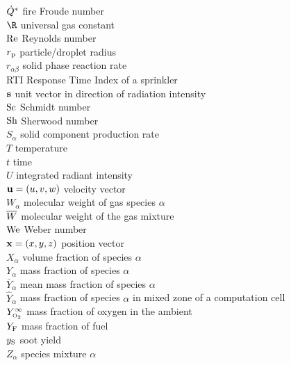 \begin{tabbing}
$\dot{Q}^*$                   \> fire Froude number \\
$\R$                      \> universal gas constant \\
$\hbox{Re}$                     \> Reynolds number \\
$r_{\rm p}$               \> particle/droplet radius \\
$r_{\alpha\beta}$         \> solid phase reaction rate \\
RTI                       \> Response Time Index of a sprinkler \\
${\mathbf{s}}$                     \> unit vector in direction of radiation intensity\\
$\hbox{Sc}$                     \> Schmidt number \\
$\hbox{Sh}$                     \> Sherwood number \\
$S_\alpha$                \> solid component production rate \\
$T$                       \> temperature \\
$t$                       \> time           \\
$U$                       \> integrated radiant intensity \\
${\mathbf{u}}=(u,v,w)$             \> velocity vector  \\
$W_\alpha$                \> molecular weight of gas species $\alpha$ \\
$\overline{W}$                     \> molecular weight of the gas mixture \\
$\hbox{We}$                     \> Weber number \\
${\mathbf{x}}=(x,y,z)$             \> position vector  \\
$X_\alpha$                \> volume fraction of species $\alpha$   \\
$Y_\alpha$                \> mass fraction of species $\alpha$   \\
$\bar{Y}_\alpha$          \> mean mass fraction of species $\alpha$   \\
$\hat{Y}_\alpha$          \> mass fraction of species $\alpha$ in mixed zone of a computation cell \\
$Y_{\text{\tiny \hbox{O}$_2$}}^\infty$          \> mass fraction of oxygen in the ambient   \\
$Y_{\rm F}$               \> mass fraction of fuel   \\
$y_{\rm S}$               \> soot yield \\
$Z_\alpha$                \> species mixture $\alpha$   \\
\hspace{0.1in}            \> \\

\end{tabbing}
